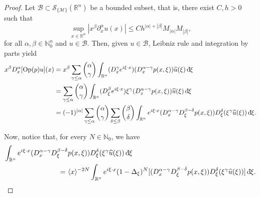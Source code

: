 \documentclass[11pt,reqno]{amsart}
\numberwithin{equation}{section}
\newcommand{\dbar}{\mathrm{d}\hspace*{-0.15em}\bar{}\hspace*{0.1em}}
\newcommand{\R}{{\mathbb{R}}} %
\newcommand{\N}{{\mathbb{N}}} %
\newcommand{\caS}{{\mathcal{S}}}
\newcommand{\M}{{\mathcal{M}}} %
\begin{document}
\begin{proof}
	Let $\mathscr{B}\subset\caS_{\{\M\}}(\R^n)$ be a bounded subset, that is, there exist $C,h>0$ such that
	\[\sup_{x\in\R^n} |x^\beta\partial_x^\alpha u(x)| \leq Ch^{|\alpha|+|\beta|}M_{|\alpha|}M_{|\beta|},\]
	for all $\alpha,\beta\in\N_0^n$ and $u\in\mathscr{B}$. Then, given $u\in \mathscr{B}$, Leibniz rule and integration by parts yield
	\begin{align*}
		x^\beta D_x^\alpha[\mathrm{Op}(p)u](x) & = x^\beta\sum_{\gamma\leq\alpha}\binom{\alpha}{\gamma}\int_{\R^n} (D_x^{\gamma}e^{i\xi\cdot x})(D_x^{\alpha-\gamma}p(x,\xi))\widehat{u}(\xi)\,\dbar\xi\\
		& = \sum_{\gamma\leq\alpha}\binom{\alpha}{\gamma}\int_{\R^n} (D_\xi^{\beta}e^{i\xi\cdot x})\xi^{\gamma}(D_x^{\alpha-\gamma}p(x,\xi))\widehat{u}(\xi)\,\dbar\xi\\
		& = (-1)^{|\alpha|}\sum_{\gamma\leq\alpha}\binom{\alpha}{\gamma} \sum_{\delta\leq\beta}\binom{\beta}{\delta}\int_{\R^n} e^{i\xi\cdot x} (D_x^{\alpha-\gamma}D_\xi^{\beta-\delta}p(x,\xi)) D_\xi^{\delta}(\xi^\gamma\widehat{u}(\xi))\,\dbar\xi.
	\end{align*}
	
	Now, notice that, for every $N\in\N_0$, we have
	\begin{align*}
		\int_{\R^n} e^{i\xi\cdot x} (D_x^{\alpha-\gamma}D_\xi^{\beta-\delta}&p(x,\xi)) D_\xi^{\delta}(\xi^\gamma\widehat{u}(\xi))\,\dbar\xi\\
		=\ & \langle x\rangle^{-2N}\int_{\R^n} e^{i\xi\cdot x}(1-\Delta_\xi)^N[(D_x^{\alpha-\gamma}D_\xi^{\beta-\delta}p(x,\xi)) D_\xi^{\delta}(\xi^\gamma\widehat{u}(\xi))]\,\dbar\xi.
	\end{align*}
	

\end{proof}
\end{document}
